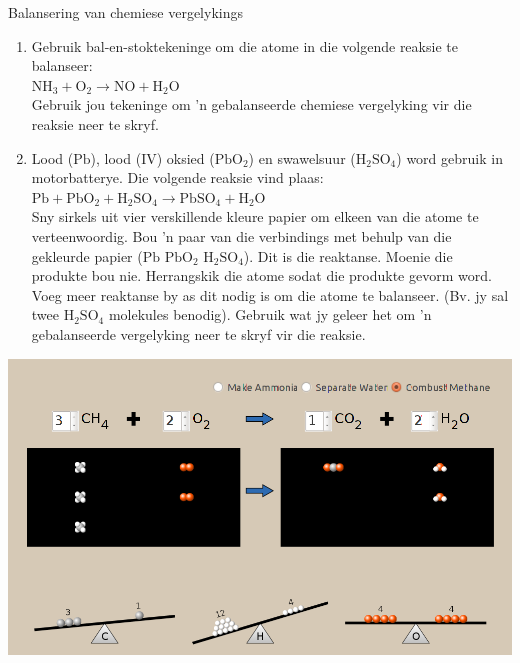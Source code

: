 \begin{activity}{Balansering van chemiese vergelykings}
\begin{enumerate}[noitemsep, label=\textbf{\arabic*}]
\item Gebruik bal-en-stoktekeninge om die atome in die volgende reaksie te balanseer:\\
${\text{NH}}_{3} + {\text{O}}_{2} \to {\text{NO}} + \text{H}_{2}\text{O}$ \\
Gebruik jou tekeninge om 'n gebalanseerde chemiese vergelyking vir die reaksie neer te skryf.

\item Lood ($\text{Pb}$), lood (IV) oksied (${\text{PbO}}_{2}$) en swawelsuur  (${\text{H}}_{2}{\text{SO}}_{4}$) word gebruik in motorbatterye. Die volgende reaksie vind plaas:
$\text{Pb} + \text{PbO}_{2} + \text{H}_{2}\text{SO}_{4} \to {\text{PbSO}}_{4} + {\text{H}}_{2}\text{O}$ \\
Sny sirkels uit vier verskillende kleure papier om elkeen van die atome te verteenwoordig. Bou 'n paar van die verbindings met behulp van die gekleurde papier ($\text{Pb}$ $\text{PbO}_{2}$ $\text{H}_{2}\text{SO}_{4}$). Dit is die reaktanse. Moenie die produkte bou nie. Herrangskik die atome sodat die produkte gevorm word. Voeg meer reaktanse by as dit nodig is om die atome te balanseer. (Bv. jy sal twee $\text{H}_{2}\text{SO}_{4}$ molekules benodig). Gebruik wat jy geleer het om 'n gebalanseerde vergelyking neer te skryf vir die reaksie.
\end{enumerate}
 \begin{center}
\includegraphics[width=.8\textwidth]{photos/BalancingChemEqu.png}\par
 \end{center}
\end{activity}
\par \label{m38726*uid10}
